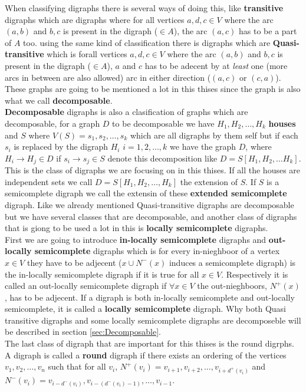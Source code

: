 When classifying digraphs there is several ways of doing this, like \textbf{transitive} digraphs which are digraphs where for all vertices $a,d,c\in V$ where the arc $(a,b)$ and $b,c$ is present in the digraph ($\in A$), the arc $(a,c)$ has to be a part of $A$ too. 
using the same kind of classification there is digraphs which are \textbf{Quasi-transitive} which is forall vertices $a,d,c\in V$ where the arc $(a,b)$ and $b,c$ is present in the digraph ($\in A$), $a$ and $c$ has to be adecent by at \textit{least} one (more arcs in between are also allowed) arc in either direction ($(a,c)$ or $(c,a)$). These graphs are going to be mentioned a lot in this thises since the graph is also what we call \textbf{decomposable}.\\
\textbf{Decomposable} digraphs is also a clasification of graphs which are decomposable, for a graph $D$ to be decomposable we have $H_1,H_2, \dots , H_k$ \textbf{houses} and $S$ where $V(S)={s_1,s_2,\dots,s_k}$ which are all digraphs by them self but if each $s_i$ is replaced by the digraph $H_i$ $i=1,2,\dots,k$ we have the graph $D$, where $H_i\rightarrow H_j \in D$ if $s_i\rightarrow s_j\in S$  denote this decomposition like $D=S[H_1,H_2,\dots H_k]$.
This is the class of digraphs we are focusing on in this thises. 
If all the houses are independent sets we call $D=S[H_1,H_2,\dots ,H_k]$ the extension of $S$. 
If $S$ is a semicomplete digraph we call the extensin of these \textbf{extended semicomplete} digraph.
Like we already mentioned Quasi-transitive digraphs are decomposable but we have several classes that are decomposable, and another class of digraphs that is giong to be used a lot in this is \textbf{locally semicomplete} digraphs.\\
First we are going to introduce \textbf{in-locally semicomplete} digraphs and \textbf{out-locally semicomplete} digraphs which is for every in-nieghboor of a vertex $x\in V$ they have to be adjecent ($x\cup N^-(x)$ induces a semicomplete digraph) is the in-locally semicomplete digraph if it is true for all $x\in V$. 
Respectively it is called an out-locally semicomplete digraph if $\forall x\in V$ the out-nieghboors, $N^+(x)$, has to be adjecent. 
If a digraph is both in-locally semicomplete and out-locally semicomplete, it is called a \textbf{locally semicomplete} digraph. Why both Quasi transitive digraphs and some locally semicomplete digraphs are decomposeble will be described in section \autoref{sec:Decomposable}.\\
The last class of digraph that are important for this thises is the round digrphs. 
A digraph is called a \textbf{round} digraph if there exists an ordering of the vertices $v_1,v_2,\dots,v_n$ such that for all $v_i$, $N^+(v_i)={v_{i+1},v_{i+2},\dots ,v_{i+d^+(v_i)}}$ and $N^-(v_i)={v_{i-d^-(v_i)},v_{i-(d^-(v_i)-1)},\dots ,v_{i-1}}$.

